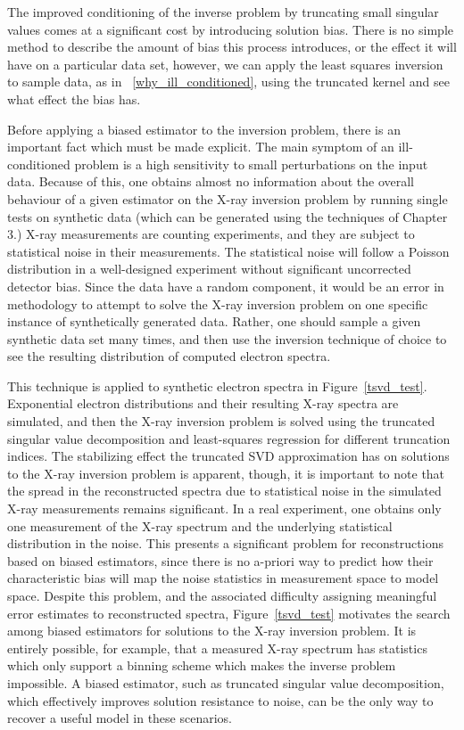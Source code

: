The improved conditioning of the inverse problem by truncating small singular values comes at a significant cost by introducing solution bias. There is no simple method to describe the amount of bias this process introduces, or the effect it will have on a particular data set, however, we can apply the least squares inversion to sample data, as in ~\ref{why_ill_conditioned}, using the truncated kernel and see what effect the bias has. 

Before applying a biased estimator to the inversion problem, there is an important fact which must be made explicit. The main symptom of an ill-conditioned problem is a high sensitivity to small perturbations on the input data. Because of this, one obtains almost no information about the overall behaviour of a given estimator on the X-ray inversion problem by running single tests on synthetic data (which can be generated using the techniques of Chapter 3.) X-ray measurements are counting experiments, and they are subject to statistical noise in their measurements. The statistical noise will follow a Poisson distribution in a well-designed experiment without significant uncorrected detector bias. Since the data have a random component, it would be an error in methodology to attempt to solve the X-ray inversion problem on one specific instance of synthetically generated data. Rather, one should sample a given synthetic data set many times, and then use the inversion technique of choice to see the resulting distribution of computed electron spectra. 

This technique is applied to synthetic electron spectra in Figure~\ref{tsvd_test}. Exponential electron distributions and their resulting X-ray spectra are simulated, and then the X-ray inversion problem is solved using the truncated singular value decomposition and least-squares regression for different truncation indices. The stabilizing effect the truncated SVD approximation has on solutions to the X-ray inversion problem is apparent, though, it is important to note that the spread in the reconstructed spectra due to statistical noise in the simulated X-ray measurements remains significant. In a real experiment, one obtains only one measurement of the X-ray spectrum and the underlying statistical distribution in the noise. This presents a significant problem for reconstructions based on biased estimators, since there is no a-priori way to predict how their characteristic bias will map the noise statistics in measurement space to model space. Despite this problem, and the associated difficulty assigning meaningful error estimates to reconstructed spectra, Figure~\ref{tsvd_test} motivates the search among biased estimators for solutions to the X-ray inversion problem. It is entirely possible, for example, that a measured X-ray spectrum has statistics which only support a binning scheme which makes the inverse problem impossible. A biased estimator, such as truncated singular value decomposition, which effectively improves solution resistance to noise, can be the only way to recover a useful model in these scenarios. 

